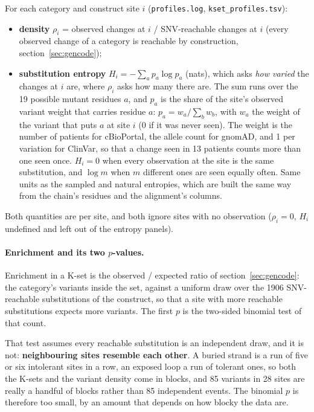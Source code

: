 \documentclass[11pt,a4paper]{article}
\newcommand{\file}[1]{\texttt{#1}}
\begin{document}
For each category and construct site $i$ (\file{profiles.log},
\file{kset\_profiles.tsv}):
\begin{itemize}
\item \textbf{density} $\rho_i$ = observed changes at $i$ /
  SNV-reachable changes at $i$ (every observed change of a category is
  reachable by construction, section~\ref{sec:gencode});
\item \textbf{substitution entropy} $H_i = -\sum_a p_a\log p_a$ (nats),
  which asks \emph{how varied} the changes at $i$ are, where $\rho_i$ asks how
  many there are. The sum runs over the 19 possible mutant residues $a$, and
  $p_a$ is the share of the site's observed variant weight that carries
  residue $a$: $p_a = w_a / \sum_b w_b$, with $w_a$ the weight of the variant
  that puts $a$ at site $i$ (0 if it was never seen). The weight is the number
  of patients for cBioPortal, the allele count for gnomAD, and 1 per
  variation for ClinVar, so that a change seen in 13 patients counts more
  than one seen once. $H_i = 0$ when every observation at the site is the same
  substitution, and $\log m$ when $m$ different ones are seen equally often.
  Same units as the sampled and natural entropies, which are built the same
  way from the chain's residues and the alignment's columns.
\end{itemize}
Both quantities are per site, and both ignore sites with no observation
($\rho_i = 0$, $H_i$ undefined and left out of the entropy panels).

\paragraph{Enrichment and its two $p$-values.} Enrichment in a K-set is the
observed / expected ratio of section~\ref{sec:gencode}: the category's
variants inside the set, against a uniform draw over the 1906 SNV-reachable
substitutions of the construct, so that a site with more reachable
substitutions expects more variants. The first $p$ is the two-sided binomial
test of that count.

That test assumes every reachable substitution is an independent draw, and it
is not: \textbf{neighbouring sites resemble each other}. A buried strand is a
run of five or six intolerant sites in a row, an exposed loop a run of
tolerant ones, so both the K-sets and the variant density come in blocks, and
85 variants in 28 sites are really a handful of blocks rather than 85
independent events. The binomial $p$ is therefore too small, by an amount
that depends on how blocky the data are.
\end{document}
